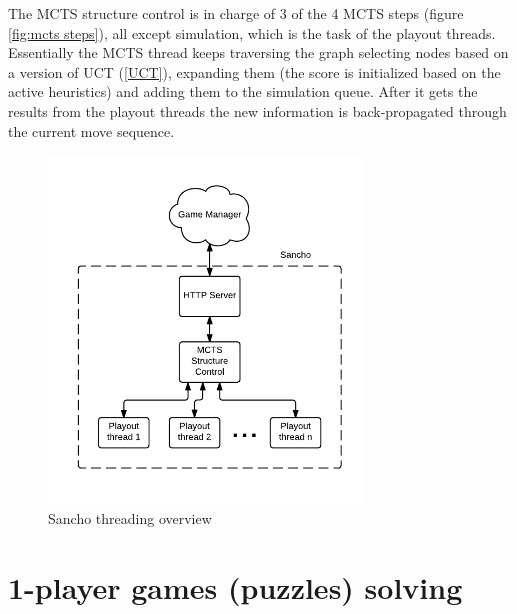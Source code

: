 The MCTS structure control is in charge of 3 of the 4 MCTS steps (figure \ref{fig:mcts steps}), all except simulation, which is the task of the playout threads.
Essentially the MCTS thread keeps traversing the graph selecting nodes based on a version of UCT (\ref{UCT}), expanding them (the score is initialized based on the active heuristics) and adding them to the simulation queue. After it gets the results from the playout threads the new information is back-propagated through the current move sequence.



\begin{figure}[h]
	\centering
	\includegraphics[width=0.75\textwidth]{images/Sancho_overview.pdf}
	\caption{Sancho threading overview}
	\label{fig:sancho_overview}
\end{figure}

\section{1-player games (puzzles) solving}


